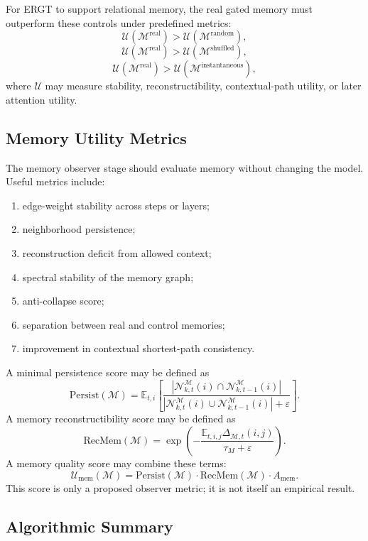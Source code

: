 \documentclass[11pt]{article}
\begin{document}
For ERGT to support relational memory, the real gated memory must outperform these controls under predefined metrics:
\[
\mathcal{U}(\mathcal{M}^{\mathrm{real}})>
\mathcal{U}(\mathcal{M}^{\mathrm{random}}),
\]
\[
\mathcal{U}(\mathcal{M}^{\mathrm{real}})>
\mathcal{U}(\mathcal{M}^{\mathrm{shuffled}}),
\]
\[
\mathcal{U}(\mathcal{M}^{\mathrm{real}})>
\mathcal{U}(\mathcal{M}^{\mathrm{instantaneous}}),
\]
where $\mathcal{U}$ may measure stability, reconstructibility, contextual-path utility, or later attention utility.

\subsection{Memory Utility Metrics}

The memory observer stage should evaluate memory without changing the model. Useful metrics include:
\begin{enumerate}[label=(\roman*)]
    \item edge-weight stability across steps or layers;
    \item neighborhood persistence;
    \item reconstruction deficit from allowed context;
    \item spectral stability of the memory graph;
    \item anti-collapse score;
    \item separation between real and control memories;
    \item improvement in contextual shortest-path consistency.
\end{enumerate}

A minimal persistence score may be defined as
\[
\mathrm{Persist}(\mathcal{M})
=
\mathbb{E}_{t,i}
\left[
\frac{|\mathcal{N}_{k,t}^{\mathcal{M}}(i)\cap\mathcal{N}_{k,t-1}^{\mathcal{M}}(i)|}
{|\mathcal{N}_{k,t}^{\mathcal{M}}(i)\cup\mathcal{N}_{k,t-1}^{\mathcal{M}}(i)|+\varepsilon}
\right].
\]
A memory reconstructibility score may be defined as
\[
\mathrm{RecMem}(\mathcal{M})
=
\exp\left(-\frac{\mathbb{E}_{t,i,j}\Delta_{\mathcal{M},t}(i,j)}{\tau_M+\varepsilon}\right).
\]
A memory quality score may combine these terms:
\[
\mathcal{U}_{\mathrm{mem}}(\mathcal{M})
=
\mathrm{Persist}(\mathcal{M})\cdot
\mathrm{RecMem}(\mathcal{M})\cdot
A_{\mathrm{mem}}.
\]
This score is only a proposed observer metric; it is not itself an empirical result.

\subsection{Algorithmic Summary}
\end{document}
